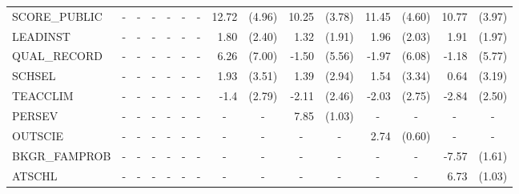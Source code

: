 \documentclass[10pt]{article}
\begin{document}
\begin{table}[htbp]
\begin{tabular}{lrlrlrlrlrlrlrl}
    SCORE\_PUBLIC & \multicolumn{1}{c}{-} & \multicolumn{1}{c}{-} & \multicolumn{1}{c}{-} & \multicolumn{1}{c}{-} & \multicolumn{1}{c}{-} & \multicolumn{1}{c}{-} & 12.72 & (4.96) & 10.25 & (3.78) & 11.45 & (4.60) & 10.77 & (3.97) \\[0.2em]
    LEADINST & \multicolumn{1}{c}{-} & \multicolumn{1}{c}{-} & \multicolumn{1}{c}{-} & \multicolumn{1}{c}{-} & \multicolumn{1}{c}{-} & \multicolumn{1}{c}{-} & 1.80  & (2.40) & 1.32  & (1.91) & 1.96  & (2.03) & 1.91  & (1.97) \\[0.2em]
    QUAL\_RECORD & \multicolumn{1}{c}{-} & \multicolumn{1}{c}{-} & \multicolumn{1}{c}{-} & \multicolumn{1}{c}{-} & \multicolumn{1}{c}{-} & \multicolumn{1}{c}{-} & 6.26  & (7.00) & -1.50 & (5.56) & -1.97 & (6.08) & -1.18 & (5.77) \\[0.2em]
    SCHSEL & \multicolumn{1}{c}{-} & \multicolumn{1}{c}{-} & \multicolumn{1}{c}{-} & \multicolumn{1}{c}{-} & \multicolumn{1}{c}{-} & \multicolumn{1}{c}{-} & 1.93  & (3.51) & 1.39  & (2.94) & 1.54  & (3.34) & 0.64  & (3.19) \\[0.2em]
    TEACCLIM & \multicolumn{1}{c}{-} & \multicolumn{1}{c}{-} & \multicolumn{1}{c}{-} & \multicolumn{1}{c}{-} & \multicolumn{1}{c}{-} & \multicolumn{1}{c}{-} & -1.4  & (2.79) & -2.11 & (2.46) & -2.03 & (2.75) & -2.84 & (2.50) \\[0.2em]
    PERSEV & \multicolumn{1}{c}{-} & \multicolumn{1}{c}{-} & \multicolumn{1}{c}{-} & \multicolumn{1}{c}{-} & \multicolumn{1}{c}{-} & \multicolumn{1}{c}{-} & \multicolumn{1}{c}{-} & \multicolumn{1}{c}{-} & 7.85  & (1.03) & \multicolumn{1}{c}{-} & \multicolumn{1}{c}{-} & \multicolumn{1}{c}{-} & \multicolumn{1}{c}{-} \\[0.2em]
    OUTSCIE & \multicolumn{1}{c}{-} & \multicolumn{1}{c}{-} & \multicolumn{1}{c}{-} & \multicolumn{1}{c}{-} & \multicolumn{1}{c}{-} & \multicolumn{1}{c}{-} & \multicolumn{1}{c}{-} & \multicolumn{1}{c}{-} & \multicolumn{1}{c}{-} & \multicolumn{1}{c}{-} & 2.74  & (0.60) & \multicolumn{1}{c}{-} & \multicolumn{1}{c}{-} \\[0.2em]
    BKGR\_FAMPROB & \multicolumn{1}{c}{-} & \multicolumn{1}{c}{-} & \multicolumn{1}{c}{-} & \multicolumn{1}{c}{-} & \multicolumn{1}{c}{-} & \multicolumn{1}{c}{-} & \multicolumn{1}{c}{-} & \multicolumn{1}{c}{-} & \multicolumn{1}{c}{-} & \multicolumn{1}{c}{-} & \multicolumn{1}{c}{-} & \multicolumn{1}{c}{-} & -7.57 & (1.61) \\[0.2em]
    ATSCHL & \multicolumn{1}{c}{-} & \multicolumn{1}{c}{-} & \multicolumn{1}{c}{-} & \multicolumn{1}{c}{-} & \multicolumn{1}{c}{-} & \multicolumn{1}{c}{-} & \multicolumn{1}{c}{-} & \multicolumn{1}{c}{-} & \multicolumn{1}{c}{-} & \multicolumn{1}{c}{-} & \multicolumn{1}{c}{-} & \multicolumn{1}{c}{-} & 6.73  & (1.03) \\[0.2em]

\end{tabular}
\end{table}
\end{document}
